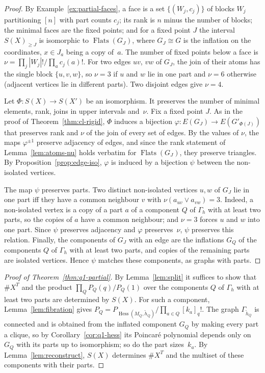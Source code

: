 \documentclass[11pt,a4paper]{article}
\numberwithin{equation}{section}
\theoremstyle{plain}
\theoremstyle{definition}
\theoremstyle{remark}
\DeclareMathOperator{\Hess}{Hess}
\DeclareMathOperator{\Flats}{Flats}
\begin{document}
\begin{proof}
By Example~\ref{ex:partial-faces}, a face is a set $\{(W_j,c_j)\}$ of blocks $W_j$ partitioning $[n]$ with part counts $c_j$; its rank is $n$ minus the number of blocks; the minimal faces are the fixed points; and for a fixed point $J$ the interval $S(X)_{\geqslant J}$ is isomorphic to $\Flats(G_J)$, where $G_J\cong G$ is the inflation on the coordinates, $x\in J_a$ being a copy of~$a$. The number of fixed points below a face is $\nu=\prod_j|W_j|!/\prod_a c_j(a)!$. For two edges $uv$, $vw$ of $G_J$, the join of their atoms has the single block $\{u,v,w\}$, so $\nu=3$ if $u$ and $w$ lie in one part and $\nu=6$ otherwise (adjacent vertices lie in different parts). Two disjoint edges give $\nu=4$.

Let $\Phi\colon S(X)\to S(X')$ be an isomorphism. It preserves the number of minimal elements, rank, joins in upper intervals and~$\nu$. Fix a fixed point $J$. As in the proof of Theorem~\ref{thm:cl-rigid}, $\Phi$ induces a bijection $\varphi\colon E(G_J)\to E(G'_{\Phi(J)})$ that preserves rank and $\nu$ of the join of every set of edges. By the values of $\nu$, the maps $\varphi^{\pm1}$ preserve adjacency of edges, and since the rank statement of Lemma~\ref{lem:atoms-nu} holds verbatim for $\Flats(G_J)$, they preserve triangles. By Proposition~\ref{prop:edge-iso}, $\varphi$ is induced by a bijection $\psi$ between the non-isolated vertices.

The map $\psi$ preserves parts. Two distinct non-isolated vertices $u,w$ of $G_J$ lie in one part iff they have a common neighbour $v$ with $\nu(a_{uv}\vee a_{vw})=3$. Indeed, a non-isolated vertex is a copy of a part $a$ of a component $Q$ of $\Gamma_h$ with at least two parts, so the copies of $a$ have a common neighbour; and $\nu=3$ forces $u$ and $w$ into one part. Since $\psi$ preserves adjacency and $\varphi$ preserves~$\nu$, $\psi$ preserves this relation. Finally, the components of $G_J$ with an edge are the inflations $G_Q$ of the components $Q$ of $\Gamma_h$ with at least two parts, and copies of the remaining parts are isolated vertices. Hence $\psi$ matches these components, as graphs with parts.
\end{proof}

\begin{proof}[Proof of Theorem~\ref{thm:q1-partial}]
By Lemma~\ref{lem:split} it suffices to show that $\#X^T$ and the product $\prod_QP_Q(q)/P_Q(1)$ over the components $Q$ of $\Gamma_h$ with at least two parts are determined by $S(X)$. For such a component, Lemma~\ref{lem:fibration} gives $P_Q=P_{\Hess(M_Q,\tilde h_Q)}/\prod_{a\in Q}[k_a]_q!$. The graph $\Gamma_{\tilde h_Q}$ is connected and is obtained from the inflated component $G_Q$ by making every part a clique, so by Corollary~\ref{cor:q1-hess} its Poincaré polynomial depends only on $G_Q$ with its parts up to isomorphism; so do the part sizes~$k_a$. By Lemma~\ref{lem:reconstruct}, $S(X)$ determines $\#X^T$ and the multiset of these components with their parts.
\end{proof}
\end{document}
